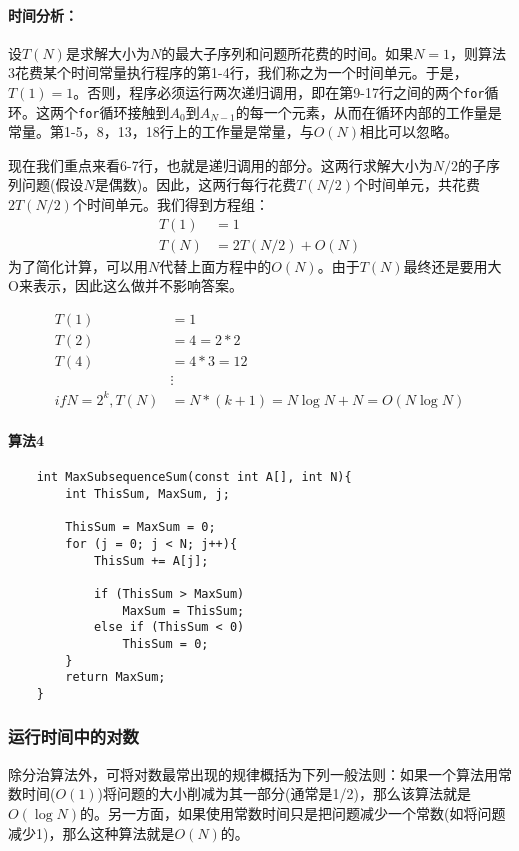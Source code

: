 \documentclass[utf8]{ctexbook}
\begin{document}
\paragraph{时间分析：} 设$T(N)$是求解大小为$N$的最大子序列和问题所花费的时间。如果$N=1$，则算法3花费某个时间常量执行程序的第1-4行，我们称之为一个时间单元。于是，$T(1) = 1$。否则，程序必须运行两次递归调用，即在第9-17行之间的两个\verb|for|循环。这两个\verb|for|循环接触到$A_0$到$A_{N-1}$的每一个元素，从而在循环内部的工作量是常量。第1-5，8，13，18行上的工作量是常量，与$O(N)$相比可以忽略。

现在我们重点来看6-7行，也就是递归调用的部分。这两行求解大小为$N/2$的子序列问题(假设$N$是偶数)。因此，这两行每行花费$T(N/2)$个时间单元，共花费$2T(N/2)$个时间单元。我们得到方程组：
\begin{align*}
    T(1) & =  1 
    \\ T(N) &= 2T(N/2) + O(N)
\end{align*}
为了简化计算，可以用$N$代替上面方程中的$O(N)$。由于$T(N)$最终还是要用大O来表示，因此这么做并不影响答案。 

\begin{align*}
    T(1)& = 1\\
    T(2)& = 4 = 2*2\\
    T(4)&= 4 * 3 = 12 \\
        &\vdots \\
    if N= 2^k, T(N)&= N*(k+1) = N\log N + N = O(N\log N)
\end{align*}

\paragraph{算法4}

\begin{lstlisting}
    int MaxSubsequenceSum(const int A[], int N){
        int ThisSum, MaxSum, j;

        ThisSum = MaxSum = 0;
        for (j = 0; j < N; j++){
            ThisSum += A[j];
            
            if (ThisSum > MaxSum)
                MaxSum = ThisSum;
            else if (ThisSum < 0)
                ThisSum = 0;
        }
        return MaxSum;
    }
\end{lstlisting}
\subsubsection{运行时间中的对数}
    除分治算法外，可将对数最常出现的规律概括为下列一般法则：{\kaishu 如果一个算法用常数时间($O(1)$)将问题的大小削减为其一部分(通常是1/2)，那么该算法就是$O(\log N)$的。另一方面，如果使用常数时间只是把问题减少一个常数(如将问题减少1)，那么这种算法就是$O(N)$的。}
\end{document}
